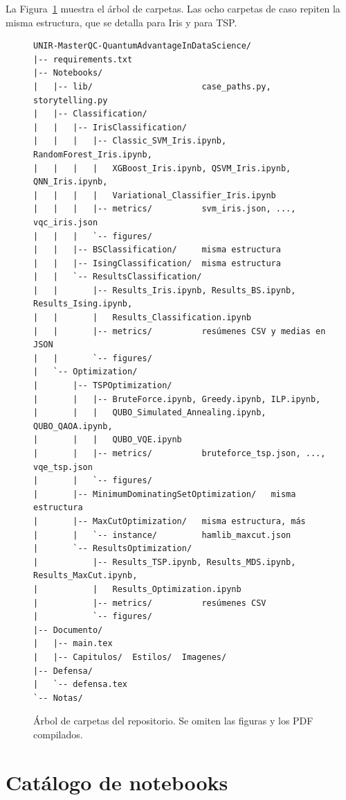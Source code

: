 La Figura~\ref{fig:repo_tree} muestra el árbol de carpetas. Las ocho carpetas de caso repiten la misma estructura, que se detalla para Iris y para TSP.

\begin{figure}[!htbp]
\centering
\begin{minipage}{0.92\linewidth}
\scriptsize
\begin{verbatim}
UNIR-MasterQC-QuantumAdvantageInDataScience/
|-- requirements.txt
|-- Notebooks/
|   |-- lib/                      case_paths.py, storytelling.py
|   |-- Classification/
|   |   |-- IrisClassification/
|   |   |   |-- Classic_SVM_Iris.ipynb, RandomForest_Iris.ipynb,
|   |   |   |   XGBoost_Iris.ipynb, QSVM_Iris.ipynb, QNN_Iris.ipynb,
|   |   |   |   Variational_Classifier_Iris.ipynb
|   |   |   |-- metrics/          svm_iris.json, ..., vqc_iris.json
|   |   |   `-- figures/
|   |   |-- BSClassification/     misma estructura
|   |   |-- IsingClassification/  misma estructura
|   |   `-- ResultsClassification/
|   |       |-- Results_Iris.ipynb, Results_BS.ipynb, Results_Ising.ipynb,
|   |       |   Results_Classification.ipynb
|   |       |-- metrics/          resúmenes CSV y medias en JSON
|   |       `-- figures/
|   `-- Optimization/
|       |-- TSPOptimization/
|       |   |-- BruteForce.ipynb, Greedy.ipynb, ILP.ipynb,
|       |   |   QUBO_Simulated_Annealing.ipynb, QUBO_QAOA.ipynb,
|       |   |   QUBO_VQE.ipynb
|       |   |-- metrics/          bruteforce_tsp.json, ..., vqe_tsp.json
|       |   `-- figures/
|       |-- MinimumDominatingSetOptimization/   misma estructura
|       |-- MaxCutOptimization/   misma estructura, más
|       |   `-- instance/         hamlib_maxcut.json
|       `-- ResultsOptimization/
|           |-- Results_TSP.ipynb, Results_MDS.ipynb, Results_MaxCut.ipynb,
|           |   Results_Optimization.ipynb
|           |-- metrics/          resúmenes CSV
|           `-- figures/
|-- Documento/
|   |-- main.tex
|   |-- Capitulos/  Estilos/  Imagenes/
|-- Defensa/
|   `-- defensa.tex
`-- Notas/
\end{verbatim}
\end{minipage}
\caption{Árbol de carpetas del repositorio. Se omiten las figuras y los PDF compilados.}
\label{fig:repo_tree}
\end{figure}

\section{Catálogo de notebooks}
\label{anx:notebooks}

